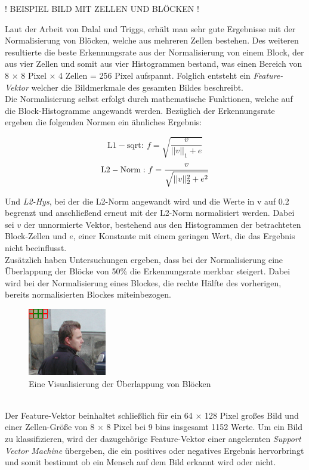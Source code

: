 \vspace{5 mm}
! BEISPIEL BILD MIT ZELLEN UND BLÖCKEN !
\vspace{5 mm}

Laut der Arbeit von Dalal und Triggs, erhält man sehr gute Ergebnisse mit der Normalisierung von Blöcken, welche aus mehreren Zellen bestehen. Des weiteren resultierte die beste Erkennungsrate aus der Normalisierung von einem Block, der aus vier Zellen und somit aus vier Histogrammen bestand, was einen Bereich von 8 $\times$ 8 Pixel $\times$ 4 Zellen = 256 Pixel aufspannt.
Folglich entsteht ein \emph{Feature-Vektor} welcher die Bildmerkmale des gesamten Bildes beschreibt.\\
Die Normalisierung selbst erfolgt durch mathematische Funktionen, welche auf die Block-Histogramme angewandt werden. Bezüglich der Erkennungsrate ergeben die folgenden Normen ein ähnliches Ergebnis:

$$\mathrm{L1-sqrt:\ } f=\sqrt{\frac{v}{\lvert\lvert v \rvert\rvert_1+e}}$$
\vspace{5 mm}
$$\mathrm{L2-Norm:\ } f=\frac{v}{\sqrt{\strut{\lvert\lvert v \rvert\rvert^2_2+e^{2}}}}$$

Und \emph{L2-Hys}, bei der die L2-Norm angewandt wird und die Werte in v auf 0.2 begrenzt und anschließend erneut mit der L2-Norm normalisiert werden. Dabei sei $v$ der unnormierte Vektor, bestehend aus den Histogrammen der betrachteten Block-Zellen und $e$, einer Konstante mit einem geringen Wert, die das Ergebnis nicht beeinflusst.\\
Zusätzlich haben Untersuchungen ergeben, dass bei der Normalisierung eine Überlappung der Blöcke von 50\% die Erkennungsrate merkbar steigert. Dabei wird bei der Normalisierung eines Blockes, die rechte Hälfte des vorherigen, bereits normalisierten Blockes miteinbezogen. \cite{dalal:inria-00548512}
\begin{figure}[htbp]\centering 
	\includegraphics[width=.4\linewidth,resolution=90]{./pics/BlockBildHOG.png} 
	\caption{Eine Visualisierung der Überlappung von Blöcken}
	\label{fig:hog_overlap_example}
\end{figure}\\
Der Feature-Vektor beinhaltet schließlich für ein 64 $\times$ 128 Pixel großes Bild und einer Zellen-Größe von 8 $\times$ 8 Pixel bei 9 bins insgesamt 1152 Werte. Um ein Bild zu klassifizieren, wird der dazugehörige Feature-Vektor einer angelernten \emph{Support Vector Machine} übergeben, die ein positives oder negatives Ergebnis hervorbringt und somit bestimmt ob ein Mensch auf dem Bild erkannt wird oder nicht.

